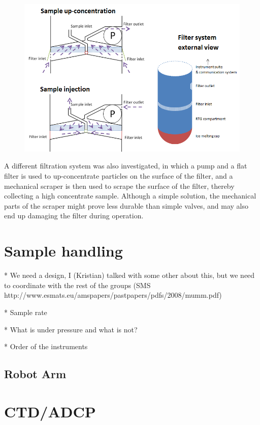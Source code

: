 \begin{figure}[htb]
	\centering
	\includegraphics[width=\textwidth]{figures/mlh/filter_multi.PNG}
	\caption{}
	\label{fig:filter}
\end{figure}

A different filtration system was also investigated, in which a pump and a flat filter is used to up-concentrate particles on the surface of the filter, and a mechanical scraper is then used to scrape the surface of the filter, thereby collecting a high concentrate sample. Although a simple solution, the mechanical parts of the scraper might prove less durable than simple valves, and may also end up damaging the filter during operation. 

\section{Sample handling}

* We need a design, I (Kristian) talked with some other about this, but we need to coordinate with the rest of the groups
   (SMS http://www.esmats.eu/amspapers/pastpapers/pdfs/2008/mumm.pdf)

* Sample rate

* What is under pressure and what is not?

* Order of the instruments

\subsection{Robot Arm} %


\section{CTD/ADCP}


